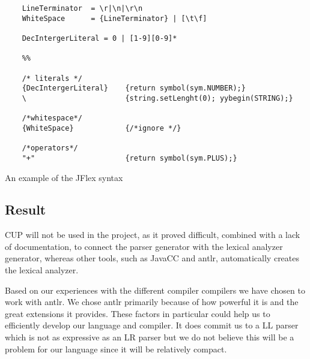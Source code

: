 \begin{listing}[htb!]
  \centering
  \begin{verbatim}
    LineTerminator  = \r|\n|\r\n
    WhiteSpace      = {LineTerminator} | [\t\f]

    DecIntergerLiteral = 0 | [1-9][0-9]*

    %%

    /* literals */
    {DecIntergerLiteral}    {return symbol(sym.NUMBER);}
    \                       {string.setLenght(0); yybegin(STRING);}

    /*whitespace*/ 
    {WhiteSpace}            {/*ignore */}  
    
    /*operators*/
    "+"                     {return symbol(sym.PLUS);}
  \end{verbatim}
  \caption{An example of the JFlex syntax}
  \label{List:jflex}
\end{listing}


\subsection{Result}
CUP will not be used in the project, as it proved difficult, combined with a lack of documentation, to connect the parser generator with the lexical analyzer generator, whereas other tools, such as JavaCC and \gls{antlr}, automatically creates the lexical analyzer.


Based on our experiences with the different compiler compilers we have chosen to work with \gls{antlr}. We chose \gls{antlr} primarily because of how powerful it is and the great extensions it provides. These factors in particular could help us to efficiently develop our language and compiler. It does commit us to a LL parser which is not as expressive as an LR parser but we do not believe this will be a problem for our language since it will be relatively compact.
